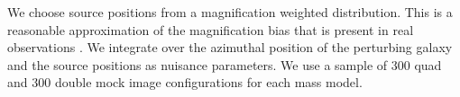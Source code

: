 We choose source positions from a magnification weighted distribution. This is a reasonable approximation of the magnification bias that is present in real observations \citep[see][]{Keeton04}. We integrate over the azimuthal position of the perturbing galaxy and the source positions as nuisance parameters. We use a sample of 300 quad and 300 double mock image configurations for each mass model.